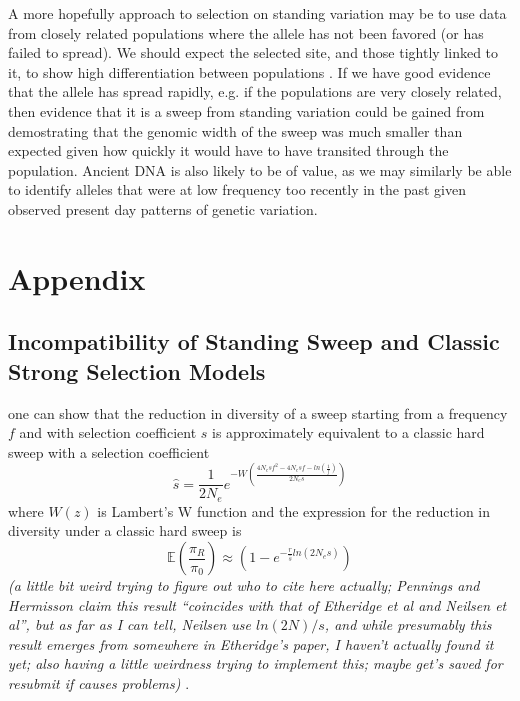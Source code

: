 \documentclass[a4paper,10pt]{article}
\newcommand{\jb}[1]{{\it\color{blue} (#1)} }
\begin{document}
A more hopefully approach to selection on standing variation may be to use data from closely related populations where the allele has not been favored (or has failed to spread). We should expect the selected site, and those tightly linked to it, to show high differentiation between populations \citep{Innan:2008ii}. If we have good evidence that the allele has spread rapidly, e.g. if the populations are very closely related, then evidence that it is a sweep from standing variation could be gained from demostrating that the genomic width of the sweep was much smaller than expected given how quickly it would have to have transited through the population. Ancient DNA is also likely to be of value, as we may similarly be able to identify alleles that were at low frequency too recently in the past given observed present day patterns of genetic variation.


\section{Appendix}

\subsection{Incompatibility of Standing Sweep and Classic Strong Selection Models}

one can show that the reduction in diversity of a sweep starting from a frequency $f$ and with selection coefficient $s$ is approximately equivalent to a classic hard sweep with a selection coefficient
\begin{equation}
	\hat{s} = \frac{1}{2N_e} e^{-W\left(\frac{4N_e sf^2 - 4N_e s f  - ln \left( \frac{1}{f} \right)}{2N_es}\right)}
\end{equation}
where $W\left(z\right)$ is Lambert's W function and the expression for the reduction in diversity under a classic hard sweep is
\begin{equation}
	\mathbb{E}\left(\frac{\pi_R}{\pi_0}\right) \approx \left(1- e^{-\frac{r}{\hat{s}}ln\left(2N_e \hat{s}\right)} \right)
\end{equation}
\citep{Pennings2006} \jb{a little bit weird trying to figure out who to cite here actually; Pennings and Hermisson claim this result ``coincides with that of Etheridge et al and Neilsen et al'', but as far as I can tell, Neilsen use $ln(2N)/s$, and while presumably this result emerges from somewhere in Etheridge's paper, I haven't actually found it yet; also having a little weirdness trying to implement this; maybe get's saved for resubmit if causes problems}.
\end{document}
